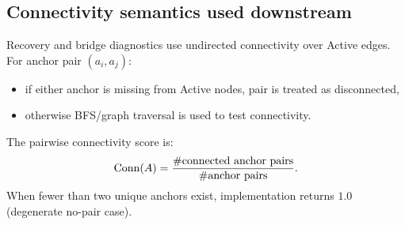 \subsection{Connectivity semantics used downstream}
Recovery and bridge diagnostics use undirected connectivity over Active edges.
For anchor pair $(a_i,a_j)$:
\begin{itemize}
\item if either anchor is missing from Active nodes, pair is treated as disconnected,
\item otherwise BFS/graph traversal is used to test connectivity.
\end{itemize}
The pairwise connectivity score is:
\[
\operatorname{Conn}(A)=\frac{\#\text{connected anchor pairs}}{\#\text{anchor pairs}}.
\]
When fewer than two unique anchors exist, implementation returns $1.0$ (degenerate no-pair case).
